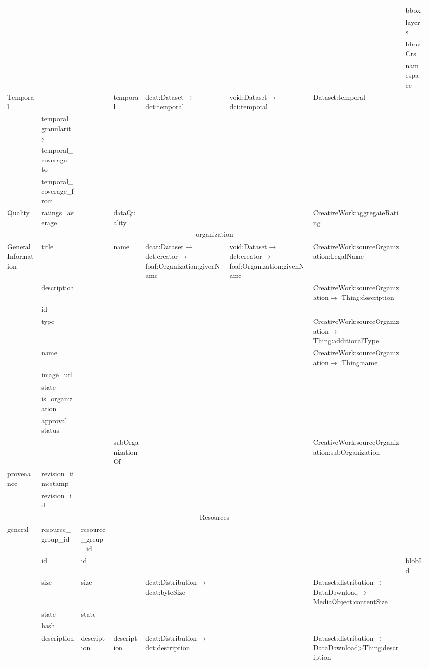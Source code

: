 \documentclass[runningheads,a4paper]{llncs}
\begin{document}
\begin{landscape}
{\begin{longtable}{|p{1cm}|m{2.3cm}|m{2.2cm}|m{2.5cm}|p{3.6cm}|m{3.6cm}|m{3.6cm}|m{2.5cm}|}
\cline{2-8}
 &  &  &  &  &  &  & bbox\tabularnewline
\cline{2-8}
 &  &  &  &  &  &  & layers\tabularnewline
\cline{2-8}
 &  &  &  &  &  &  & bboxCrs\tabularnewline
\cline{2-8}
 &  &  &  &  &  &  & namespace\tabularnewline
\hline
\multirow{4}{2cm}{Temporal} &  &  & temporal & dcat:Dataset$\rightarrow$ dct:temporal & void:Dataset$\rightarrow$ dct:temporal & Dataset:temporal & \tabularnewline
\cline{2-8}
 & temporal\_granularity &  &  &  &  &  & \tabularnewline
\cline{2-8}
 & temporal\_coverage\_to &  &  &  &  &  & \tabularnewline
\cline{2-8}
 & temporal\_coverage\_from &  &  &  &  &  & \tabularnewline
\hline
Quality & ratings\_average &  & dataQuality &  &  & CreativeWork:aggregateRating & \tabularnewline
\hline
\multicolumn{8}{|c|}{organization}\tabularnewline
\hline
\multirow{10}{2cm}{General Information} & title &  & name & dcat:Dataset$\rightarrow$ dct:creator$\rightarrow$ foaf:Organization:givenName & void:Dataset$\rightarrow$ dct:creator$\rightarrow$ foaf:Organization:givenName & CreativeWork:sourceOrganization:LegalName & \tabularnewline
\cline{2-8}
 & description &  &  &  &  & CreativeWork:sourceOrganization$\rightarrow$ Thing:description & \tabularnewline
\cline{2-8}
 & id &  &  &  &  &  & \tabularnewline
\cline{2-8}
 & type &  &  &  &  & CreativeWork:sourceOrganization$\rightarrow$ Thing:additionalType & \tabularnewline
\cline{2-8}
 & name &  &  &  &  & CreativeWork:sourceOrganization$\rightarrow$ Thing:name & \tabularnewline
\cline{2-8}
 & image\_url &  &  &  &  &  & \tabularnewline
\cline{2-8}
 & state &  &  &  &  &  & \tabularnewline
\cline{2-8}
 & is\_organization &  &  &  &  &  & \tabularnewline
\cline{2-8}
 & approval\_status &  &  &  &  &  & \tabularnewline
\cline{2-8}
 &  &  & subOrganizationOf &  &  & CreativeWork:sourceOrganization:subOrganization & \tabularnewline
\hline
\multirow{2}{2cm}{provenance} & revision\_timestamp &  &  &  &  &  & \tabularnewline
\cline{2-8}
 & revision\_id &  &  &  &  &  & \tabularnewline
\hline
\multicolumn{8}{|c|}{Resources}\tabularnewline
\hline
\multirow{15}{2cm}{general} & resource\_group\_id & resource\_group\_id &  &  &  &  & \tabularnewline
\cline{2-8}
 & id & id &  &  &  &  & blobId\tabularnewline
\cline{2-8}
 & size & size &  & dcat:Distribution$\rightarrow$ dcat:byteSize &  & Dataset:distribution$\rightarrow$ DataDownload$\rightarrow$ MediaObject:contentSize & \tabularnewline
\cline{2-8}
 & state & state &  &  &  &  & \tabularnewline
\cline{2-8}
 & hash &  &  &  &  &  & \tabularnewline
\cline{2-8}
 & description & description & description & dcat:Distribution$\rightarrow$ dct:description &  & Dataset:distribution$\rightarrow$ DataDownload>Thing:description & \tabularnewline

\end{longtable}}
\end{landscape}
\end{document}

